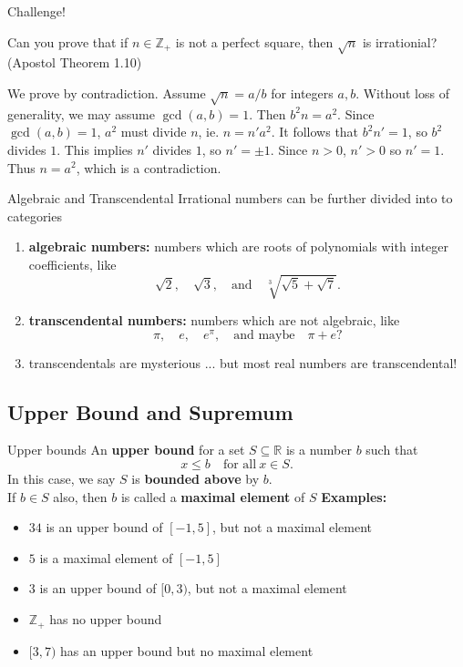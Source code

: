 \documentclass{beamer}
\begin{document}
\begin{frame}{Challenge!}
\begin{prob}
Can you prove that if $n\in\mathbb{Z}_+$ is not a perfect square, then $\sqrt{n}$ is irrationial?
(Apostol Theorem 1.10)
\end{prob}
\pause
\begin{soln}
We prove by contradiction. \pause
Assume $\sqrt{n} = a/b$ for integers $a,b$. \pause
Without loss of generality, we may assume $\gcd(a,b) = 1$. \pause
Then $b^2n = a^2$. \pause
Since $\gcd(a,b) = 1$, $a^2$ must divide $n$, ie. $n=n'a^2$. \pause
It follows that $b^2n' = 1$, so $b^2$ divides $1$. \pause
This implies $n'$ divides $1$, so $n'=\pm 1$. \pause
Since $n>0$, $n'>0$ so $n'=1$. \pause
Thus $n=a^2$, which is a contradiction.
\end{soln}
\end{frame}

\begin{frame}{Algebraic and Transcendental}
Irrational numbers can be further divided into to categories
\pause
\begin{enumerate}
\item \textbf{algebraic numbers:} numbers which are roots of polynomials with integer coefficients, like
$$\sqrt{2},\quad\sqrt{3},\quad\text{and}\quad\sqrt[3]{\sqrt{5}  + \sqrt{7}}.$$
\pause
\item \textbf{transcendental numbers:} numbers which are not algebraic, like
$$\pi,\quad e,\quad e^\pi,\quad\text{and maybe}\quad\pi+e?$$
\pause
\item transcendentals are mysterious ... but most real numbers are transcendental!
\end{enumerate}
\end{frame}

\subsection{Upper Bound and Supremum}

\begin{frame}{Upper bounds}
An \textbf{upper bound} for a set $S\subseteq\mathbb{R}$ is a number $b$ such that
$$x \leq b\quad\text{for all}\ x\in S.$$
\pause
In this case, we say $S$ is \textbf{bounded above} by $b$.\\
\pause
If $b\in S$ also, then $b$ is called a \textbf{maximal element} of $S$
\pause
\textbf{Examples:}
\begin{itemize}
\pause
\item $34$ is an upper bound of $[-1,5]$, but not a maximal element
\pause
\item $5$ is a maximal element of $[-1,5]$
\pause
\item $3$ is an upper bound of $[0,3)$, but not a maximal element
\pause
\item $\mathbb{Z}_+$ has no upper bound
\pause
\item $[3,7)$ has an upper bound but no maximal element
\end{itemize}
\end{frame}
\end{document}
